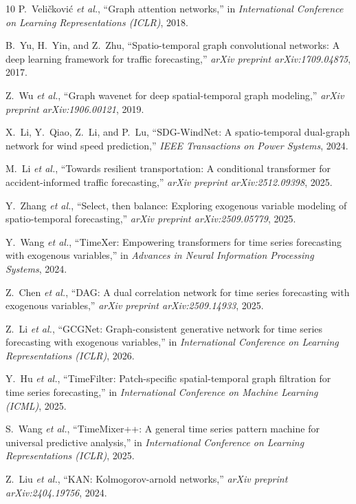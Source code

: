 \begin{thebibliography}{10}
P.~Veli{\v{c}}kovi{\'{c}} \emph{et al.}, ``Graph attention networks,'' in \emph{International Conference on Learning Representations (ICLR)}, 2018.

B.~Yu, H.~Yin, and Z.~Zhu, ``Spatio-temporal graph convolutional networks: A deep learning framework for traffic forecasting,'' \emph{arXiv preprint arXiv:1709.04875}, 2017.

Z.~Wu \emph{et al.}, ``Graph wavenet for deep spatial-temporal graph modeling,'' \emph{arXiv preprint arXiv:1906.00121}, 2019.

X.~Li, Y.~Qiao, Z.~Li, and P.~Lu, ``{SDG-WindNet}: A spatio-temporal dual-graph network for wind speed prediction,'' \emph{IEEE Transactions on Power Systems}, 2024.

M.~Li \emph{et al.}, ``Towards resilient transportation: A conditional transformer for accident-informed traffic forecasting,'' \emph{arXiv preprint arXiv:2512.09398}, 2025.

Y.~Zhang \emph{et al.}, ``Select, then balance: Exploring exogenous variable modeling of spatio-temporal forecasting,'' \emph{arXiv preprint arXiv:2509.05779}, 2025.

Y.~Wang \emph{et al.}, ``TimeXer: Empowering transformers for time series forecasting with exogenous variables,'' in \emph{Advances in Neural Information Processing Systems}, 2024.

Z.~Chen \emph{et al.}, ``DAG: A dual correlation network for time series forecasting with exogenous variables,'' \emph{arXiv preprint arXiv:2509.14933}, 2025.

Z.~Li \emph{et al.}, ``GCGNet: Graph-consistent generative network for time series forecasting with exogenous variables,'' in \emph{International Conference on Learning Representations (ICLR)}, 2026.

Y.~Hu \emph{et al.}, ``{TimeFilter}: Patch-specific spatial-temporal graph filtration for time series forecasting,'' in \emph{International Conference on Machine Learning (ICML)}, 2025.

S.~Wang \emph{et al.}, ``{TimeMixer++}: A general time series pattern machine for universal predictive analysis,'' in \emph{International Conference on Learning Representations (ICLR)}, 2025.

Z.~Liu \emph{et al.}, ``{KAN}: Kolmogorov-arnold networks,'' \emph{arXiv preprint arXiv:2404.19756}, 2024.


\end{thebibliography}
